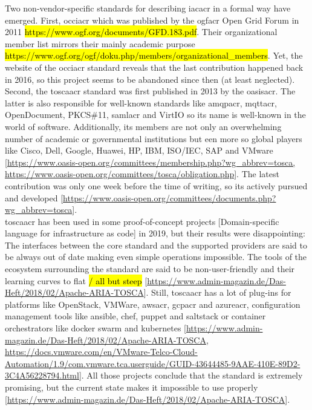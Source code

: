 Two non-vendor-specific standards for describing \gls{iacacr} in a formal way have emerged. First, \gls{occiacr} which was published by the \gls{ogfacr} Open Grid Forum in 2011 \hl{https://www.ogf.org/documents/GFD.183.pdf}. Their organizational member list mirrors their mainly academic purpose \hl{https://www.ogf.org/ogf/doku.php/members/organizational\_members}. Yet, the website of the \gls{occiacr} standard reveals that the last contribution happened back in 2016, so this project seems to be abandoned since then (at least neglected).
\\
Second, the \gls{toscaacr} standard was first published in 2013 by the \gls{oasisacr}. The latter is also responsible for well-known standards like \gls{amqpacr}, \gls{mqttacr}, OpenDocument, PKCS\#11, \gls{samlacr} and VirtIO so its name is well-known in the world of software. Additionally, its members are not only an overwhelming number of academic or governmental institutions but een more so global players like Cisco, Dell, Google, Huawei, HP, IBM, ISO/IEC, SAP and VMware [\url{https://www.oasis-open.org/committees/membership.php?wg\_abbrev=tosca, https://www.oasis-open.org/committees/tosca/obligation.php}]. The latest contribution was only one week before the time of writing, so its actively pursued and developed [\url{https://www.oasis-open.org/committees/documents.php?wg\_abbrev=tosca}].
\\
\gls{toscaacr} has been used in some proof-of-concept projects [Domain-specific language for infrastructure as code] in 2019, but their results were disappointing: The interfaces between the core standard and the supported providers are said to be always out of date making even simple operations impossible. The tools of the ecosystem surrounding the standard are said to be non-user-friendly and their learning curves to flat \hl{/ all but steep} [\url{https://www.admin-magazin.de/Das-Heft/2018/02/Apache-ARIA-TOSCA}].
Still, \gls{toscaacr} has a lot of plug-ins for platforms like OpenStack, VMWare, \gls{awsacr}, \gls{gcpacr} and \gls{azureacr}, configuration management tools like ansible, chef, puppet and saltstack or container orchestrators like docker swarm and kubernetes [\url{https://www.admin-magazin.de/Das-Heft/2018/02/Apache-ARIA-TOSCA}, \url{https://docs.vmware.com/en/VMware-Telco-Cloud-Automation/1.9/com.vmware.tca.userguide/GUID-43644485-9AAE-410E-89D2-3C4A56228794.html}].
All those projects conclude that the standard is extremely promising, but the current state makes it impossible to use properly [\url{https://www.admin-magazin.de/Das-Heft/2018/02/Apache-ARIA-TOSCA}].
